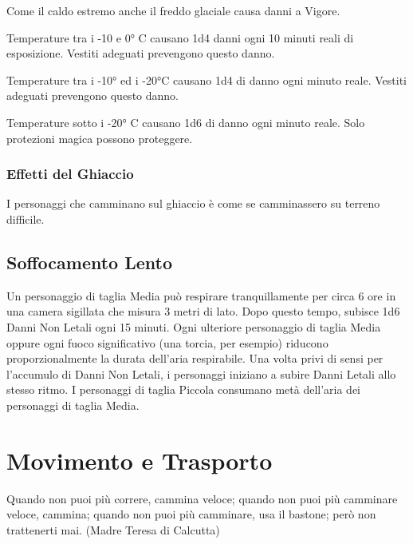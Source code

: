 \documentclass[12pt,a4paper,twoside,openany]{book}
\begin{document}
\begin{multicols}{2}
\label{pericoli-del-freddo}

Come il caldo estremo anche il freddo glaciale causa danni a Vigore.

Temperature tra i -10 e 0° C causano 1d4 danni ogni 10 minuti reali di esposizione. Vestiti adeguati prevengono questo danno.

Temperature tra i -10° ed i -20°C causano 1d4 di danno ogni minuto reale.  Vestiti adeguati prevengono questo danno.

Temperature sotto i -20° C causano 1d6 di danno ogni minuto reale. Solo protezioni magica possono proteggere.

\subsubsection{Effetti del Ghiaccio}

I personaggi che camminano sul ghiaccio è come se camminassero su terreno difficile. 

\subsection{Soffocamento Lento}

Un personaggio di taglia Media può respirare tranquillamente per circa 6 ore in una camera sigillata che misura 3 metri di lato. Dopo questo tempo, subisce 1d6 Danni Non Letali ogni 15 minuti. Ogni ulteriore personaggio di taglia Media oppure ogni fuoco significativo (una torcia, per esempio) riducono proporzionalmente la durata dell'aria respirabile. Una volta privi di sensi per l'accumulo di Danni Non Letali, i personaggi iniziano a subire Danni Letali allo stesso ritmo. I personaggi di taglia Piccola consumano metà dell'aria dei personaggi di taglia Media.

\end{multicols}

\pagebreak

\section{Movimento e Trasporto}

\label{movimento-e-trasporto}

\begin{changemargin}{0.3cm}{0.3cm}\begin{enfasi}{
Quando non puoi più correre, cammina veloce; quando non puoi più camminare veloce, cammina; quando non puoi più camminare, usa il bastone; però non trattenerti mai. (Madre Teresa di Calcutta)}
\end{enfasi}\end{changemargin}\medskip
\end{document}
